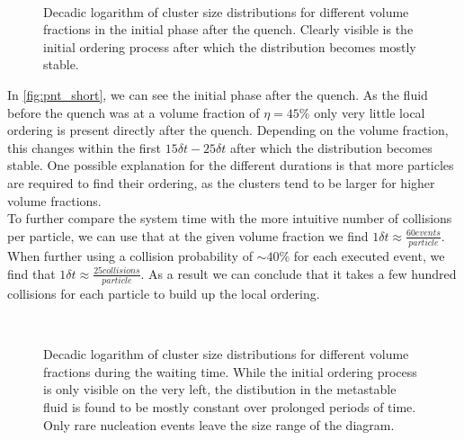 \begin{figure}[h]
\begin{center}
 \hspace{0.0cm}
\\
 \hspace{0.0cm}
\caption[Cluster size distributions over time shortly after the quench]{Decadic logarithm of cluster size distributions for different volume fractions in the initial phase after the quench. Clearly visible is the initial ordering process after which the distribution becomes mostly stable.}
\label{fig:pnt_short}
\end{center}
\end{figure}

In \autoref{fig:pnt_short}, we can see the initial phase after the quench. As the fluid before the quench was at a volume fraction of $\eta=45\%$ only very little local ordering is present directly after the quench. Depending on the volume fraction, this changes within the first $15 \delta t - 25 \delta t$ after which the distribution becomes stable. One possible explanation for the different durations is that more particles are required to find their ordering, as the clusters tend to be larger for higher volume fractions.\\
To further compare the system time with the more intuitive number of collisions per particle, we can use that at the given volume fraction we find  $1\delta t \approx \frac{60 events}{particle}$. When further using a collision probability of $\sim 40 \%$ for each executed event, we find that $1\delta t \approx \frac{25 collisions}{particle}$. As a result we can conclude that it takes a few hundred collisions for each particle to build up the local ordering.\\

\begin{figure}[h]
\begin{center}
 \hspace{0.0cm}
\\
 \hspace{0.0cm}
\caption[Cluster size distributions for long waiting times]{Decadic logarithm of cluster size distributions for different volume fractions during the waiting time. While the initial ordering process is only visible on the very left, the distibution in the metastable fluid is found to be mostly constant over prolonged periods of time. Only rare nucleation events leave the size range of the diagram.}
\label{fig:pnt_long}
\end{center}
\end{figure}

